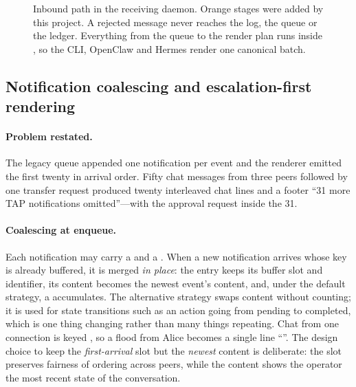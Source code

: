 \begin{figure}[htbp]
{%
}
\caption{Inbound path in the receiving daemon. Orange stages were added by this project.
A rejected message never reaches the log, the queue or the ledger. Everything from the
queue to the render plan runs inside , so the CLI, OpenClaw and Hermes render
one canonical batch.}
\label{fig:pipeline}
\end{figure}

\subsection{Notification coalescing and escalation-first rendering}
\label{sec:design-coalescing}

\paragraph{Problem restated.}
The legacy queue appended one notification per event and the renderer emitted the first
twenty in arrival order. Fifty chat messages from three peers followed by one transfer
request produced twenty interleaved chat lines and a footer ``31 more TAP notifications
omitted''---with the approval request inside the 31.

\paragraph{Coalescing at enqueue.}
Each notification may carry a  and a . When a
new notification arrives whose key is already buffered, it is merged \emph{in place}: the
entry keeps its buffer slot and identifier, its content becomes the newest event's
content, and, under the default  strategy, a  accumulates. The
alternative  strategy swaps content without counting; it is used for state
transitions such as an action going from pending to completed, which is one thing changing
rather than many things repeating. Chat from one connection is keyed
, so a flood from Alice becomes a single line
``''. The design choice to keep the
\emph{first-arrival} slot but the \emph{newest} content is deliberate: the slot preserves
fairness of ordering across peers, while the content shows the operator the most recent
state of the conversation.

